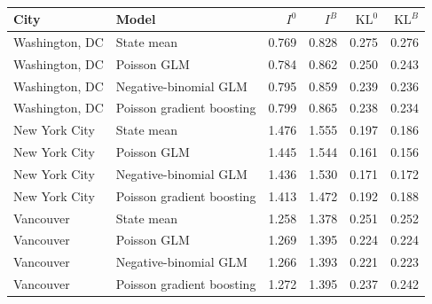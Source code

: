 \begin{table}[!htbp]
\caption{}
\label{tab:sup_two_slack}
\raggedleft
\color{red}
\setlength{\tabcolsep}{3.5pt}
\begin{tabular*}{\textwidth}{@{\extracolsep{\fill}}llrrrr@{}}
\toprule
\textbf{City} & \textbf{Model} & \textbf{$I^0$} & \textbf{$I^B$} & \textbf{$\mathrm{KL}^0$} & \textbf{$\mathrm{KL}^B$}\\
\midrule
Washington, DC & State mean & 0.769 & 0.828 & 0.275 & 0.276\\
Washington, DC & Poisson GLM & 0.784 & 0.862 & 0.250 & 0.243\\
Washington, DC & Negative-binomial GLM & 0.795 & 0.859 & 0.239 & 0.236\\
Washington, DC & Poisson gradient boosting & 0.799 & 0.865 & 0.238 & 0.234\\
New York City & State mean & 1.476 & 1.555 & 0.197 & 0.186\\
New York City & Poisson GLM & 1.445 & 1.544 & 0.161 & 0.156\\
New York City & Negative-binomial GLM & 1.436 & 1.530 & 0.171 & 0.172\\
New York City & Poisson gradient boosting & 1.413 & 1.472 & 0.192 & 0.188\\
Vancouver & State mean & 1.258 & 1.378 & 0.251 & 0.252\\
Vancouver & Poisson GLM & 1.269 & 1.395 & 0.224 & 0.224\\
Vancouver & Negative-binomial GLM & 1.266 & 1.393 & 0.221 & 0.223\\
Vancouver & Poisson gradient boosting & 1.272 & 1.395 & 0.237 & 0.242\\
\bottomrule
\end{tabular*}
\end{table}
